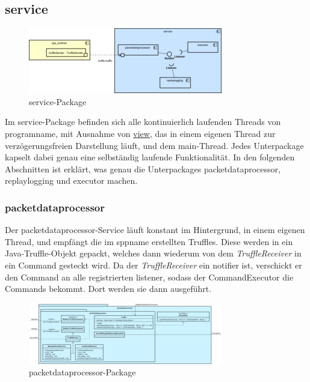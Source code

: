 \subsection{service}
\label{subsec:service}

\begin{figure}[H]
  \centering
  \includegraphics[width=\textwidth]{../diagramimages/service.png}
  \caption{service-Package}
\end{figure}

\medskip
Im service-Package befinden sich alle kontinuierlich laufenden Threads von \gls{programname},
mit Ausnahme von \hyperref[subsec:view]{view}, das in einem eigenen Thread zur verzögerungsfreien Darstellung läuft, und dem
main-Thread. Jedes Unterpackage kapselt dabei genau eine selbständig laufende Funktionalität. In den folgenden Abschnitten ist erklärt, was genau die Unterpackages packetdataprocessor, replaylogging und executor machen.

    \subsubsection{packetdataprocessor}
    \label{subsubsec:truffleprocessor}

    Der packetdataprocessor-Service läuft konstant im Hintergrund, in einem eigenen Thread,
    und empfängt die im \gls{sppname} erstellten Truffles.
    Diese werden in ein Java-Truffle-Objekt gepackt, welches dann wiederum von dem
    \textit{TruffleReceiver} in ein Command gesteckt wird. Da der \textit{TruffleReceiver}
    ein \gls{notifier} ist, verschickt er den Command an
    alle registrierten \gls{listener}, sodass der CommandExecutor die Commands bekommt. Dort werden sie
    dann ausgeführt.

    \clearpage
    \begin{figure}
      \centering
      \includegraphics[width=\textwidth]{../diagramimages/packetdataprocessor.png}
      \caption{packetdataprocessor-Package}
    \end{figure}
    \clearpage

